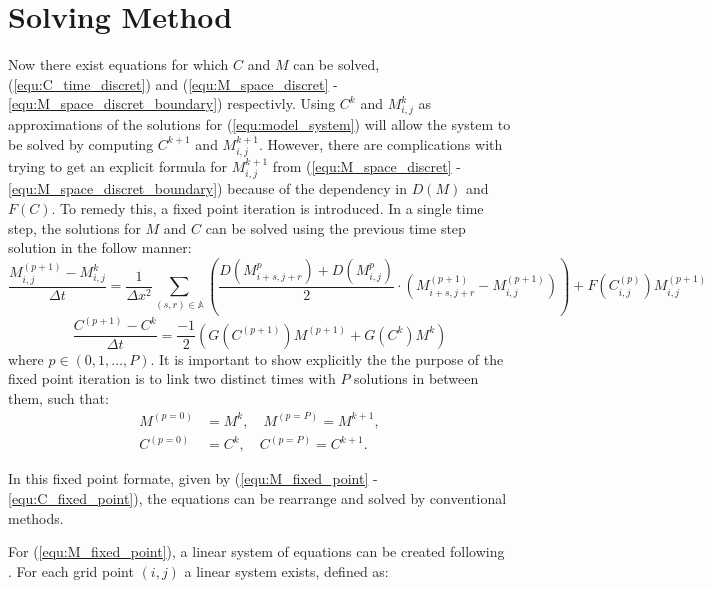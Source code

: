\section{Solving Method}

Now there exist equations for which $C$ and $M$ can be solved, (\ref{equ:C_time_discret}) and (\ref{equ:M_space_discret} - \ref{equ:M_space_discret_boundary}) respectivly.
Using $C^{k}$ and $M^{k}_{i,j}$ as approximations of the solutions for (\ref{equ:model_system}) will allow the system to be solved by computing $C^{k+1}$ and $M^{k+1}_{i,j}$.
However, there are complications with trying to get an explicit formula for $M^{k+1}_{i,j}$ from (\ref{equ:M_space_discret} - \ref{equ:M_space_discret_boundary}) because of the dependency in $D(M)$ and $F(C)$.
To remedy this, a fixed point iteration is introduced.
In a single time step, the solutions for $M$ and $C$ can be solved using the previous time step solution in the follow manner:
\begin{equation} \label{equ:M_fixed_point}
  \frac{M^{(p+1)}_{i,j} - M^{k}_{i,j}}{\Delta t} = 
    \frac{1}{\Delta x^2} \sum_{(s,r) \in \mathbb{A}}
    \left( \frac{D(M^{p}_{i+s,j+r}) + D(M^{p}_{i,j})}{2} \cdot
    ( M^{(p+1)}_{i+s, j+r} - M^{(p+1)}_{i,j}) \right) 
    + F(C^{(p)}_{i,j}) M^{(p+1)}_{i,j}
\end{equation}
\begin{equation} \label{equ:C_fixed_point}
  \frac{C^{(p+1)} - C^{k}}{\Delta t} = \frac{-1}{2} ( G(C^{(p+1)}) M^{(p+1)} + G(C^{k}) M^{k} )
\end{equation}
where $p \in (0,1,\ldots,P)$.
It is important to show explicitly the the purpose of the fixed point iteration is to link two distinct times with $P$ solutions in between them, such that:
\begin{equation}
  \begin{aligned}
  M^{(p=0)} &= M^{k}, \quad M^{(p=P)} = M^{k+1}, \\
  C^{(p=0)} &= C^{k}, \quad C^{(p=P)} = C^{k+1}.
  \end{aligned}
\end{equation}

In this fixed point formate, given by (\ref{equ:M_fixed_point} - \ref{equ:C_fixed_point}), the equations can be rearrange and solved by conventional methods.

For (\ref{equ:M_fixed_point}), a linear system of equations can be created following \cite{saad2003iterativeMethod}.
For each grid point $(i,j)$ a linear system exists, defined as:

